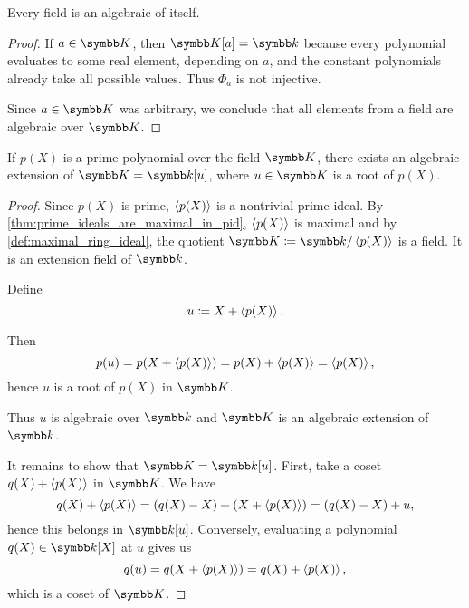 \begin{proposition}\label{thm:field_elements_are_algebraic}
  Every field is an algebraic of itself.
\end{proposition}
\begin{proof}
  If \( a \in \BK \), then \( \BK[a] = \Bk \) because every polynomial evaluates to some real element, depending on \( a \), and the constant polynomials already take all possible values. Thus \( \Phi_a \) is not injective.

  Since \( a \in \BK \) was arbitrary, we conclude that all elements from a field are algebraic over \( \BK \).
\end{proof}

\begin{theorem}\label{thm:algebraic_extension_always_exists}\cite[485]{Knapp2016BAlg}
  If \( p(X) \) is a prime polynomial over the field \( \BK \), there exists an algebraic extension of \( \BK = \Bk[u] \), where \( u \in \BK \) is a root of \( p(X) \).
\end{theorem}
\begin{proof}
  Since \( p(X) \) is prime, \( \left\langle p(X) \right\rangle \) is a nontrivial prime ideal. By \cref{thm:prime_ideals_are_maximal_in_pid}, \( \left\langle p(X) \right\rangle \) is maximal and by \cref{def:maximal_ring_ideal}, the quotient \( \BK \coloneqq \Bk / \Gen{p(X)} \) is a field. It is an extension field of \( \Bk \).

  Define
  \begin{equation*}
    u \coloneqq X + \left\langle p(X) \right\rangle.
  \end{equation*}

  Then
  \begin{equation*}
    p(u) = p(X + \left\langle p(X) \right\rangle) = p(X) + \left\langle p(X) \right\rangle = \left\langle p(X) \right\rangle,
  \end{equation*}
  hence \( u \) is a root of \( p(X) \) in \( \BK \).

  Thus \( u \) is algebraic over \( \Bk \) and \( \BK \) is an algebraic extension of \( \Bk \).

  It remains to show that \( \BK = \Bk[u] \). First, take a coset \( q(X) + \left\langle p(X) \right\rangle \) in \( \BK \). We have
  \begin{equation*}
    q(X) + \left\langle p(X) \right\rangle = (q(X) - X) + (X + \left\langle p(X) \right\rangle) = (q(X) - X) + u,
  \end{equation*}
  hence this belongs in \( \Bk[u] \). Conversely, evaluating a polynomial \( q(X) \in \Bk[X] \) at \( u \) gives us
  \begin{equation*}
    q(u) = q(X + \left\langle p(X) \right\rangle) = q(X) + \left\langle p(X) \right\rangle,
  \end{equation*}
  which is a coset of \( \BK \).
\end{proof}

